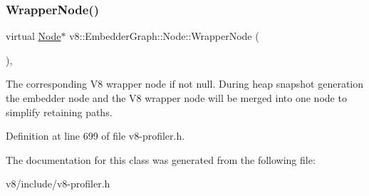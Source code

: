 \mbox{\label{classv8_1_1EmbedderGraph_1_1Node_acfe58e3b4db90c2ebbfcee5f81415181}} 
\subsubsection{\texorpdfstring{Wrapper\+Node()}{WrapperNode()}}
{\footnotesize\ttfamily virtual \mbox{\hyperlink{classv8_1_1EmbedderGraph_1_1Node}{Node}}$\ast$ v8\+::\+Embedder\+Graph\+::\+Node\+::\+Wrapper\+Node (\begin{DoxyParamCaption}{ }\end{DoxyParamCaption})\hspace{0.3cm}{\ttfamily [inline]}, {\ttfamily [virtual]}}

The corresponding V8 wrapper node if not null. During heap snapshot generation the embedder node and the V8 wrapper node will be merged into one node to simplify retaining paths. 

Definition at line 699 of file v8-\/profiler.\+h.



The documentation for this class was generated from the following file\+:\begin{DoxyCompactItemize}
\item 
v8/include/v8-\/profiler.\+h\end{DoxyCompactItemize}
